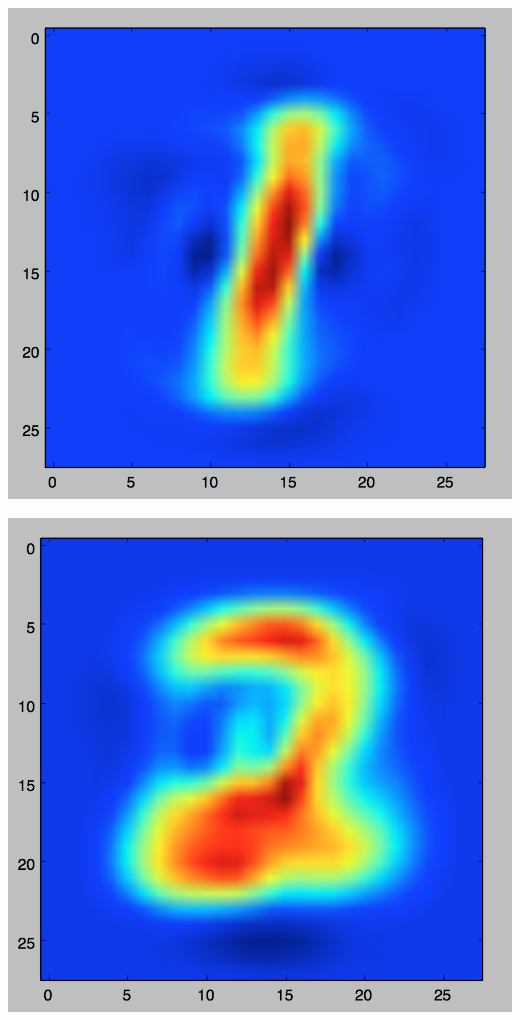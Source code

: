 \documentclass[11pt]{article}
\begin{document}
\includegraphics[scale=.3]{images/bayes1.png}

\includegraphics[scale=.3]{images/bayes2.png}
\end{document}
